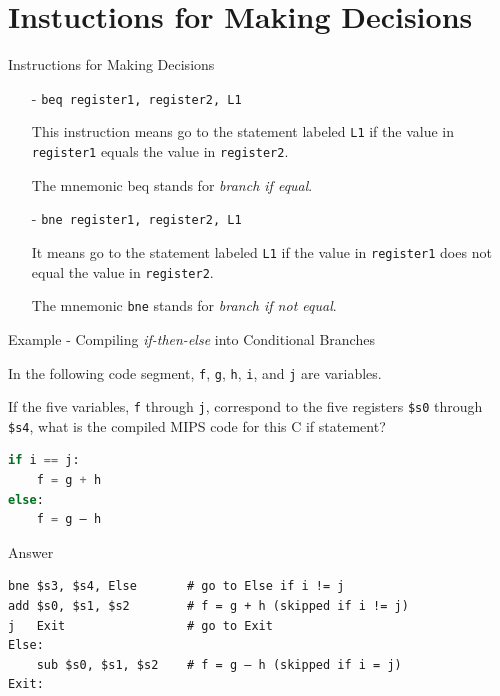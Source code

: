 \section{Instuctions for Making Decisions}
\begin{frame}{Instructions for Making Decisions}
\begin{itemize}
\item[-]
\texttt{beq register1, register2, L1}

This instruction means go to the statement labeled \texttt{L1} if the value in \texttt{register1}
equals the value in \texttt{register2}.

The mnemonic beq stands for \textit{branch if equal}.

\vspace{5mm}
\item[-]
\texttt{bne register1, register2, L1}

It means go to the statement labeled \texttt{L1} if the value in \texttt{register1} does not equal
the value in \texttt{register2}.

The mnemonic \texttt{bne} stands for \textit{branch if not equal}.
\end{itemize}
\end{frame}

\begin{frame}[fragile]{Example - Compiling \textit{if-then-else} into Conditional Branches}
\begin{flushleft}
In the following code segment, \texttt{f}, \texttt{g}, \texttt{h}, \texttt{i}, and \texttt{j} are variables. 

If the five variables, \texttt{f} through \texttt{j}, correspond to the five registers \texttt{\$s0} through \texttt{\$s4}, what is the
compiled MIPS code for this C if statement?

\begin{lstlisting}[language=python, keywordstyle=\color{purple}\textbf]
if i == j:
    f = g + h
else:
    f = g – h
\end{lstlisting}
\end{flushleft}
\end{frame}

\begin{frame}[fragile]{Answer}
\begin{lstlisting}[keywords={bne, add, j, sub}, keywordstyle=\color{purple}\textbf]
bne $s3, $s4, Else       # go to Else if i != j
add $s0, $s1, $s2        # f = g + h (skipped if i != j)
j   Exit                 # go to Exit
Else: 
    sub $s0, $s1, $s2    # f = g – h (skipped if i = j)
Exit:
\end{lstlisting}    
\end{frame}

